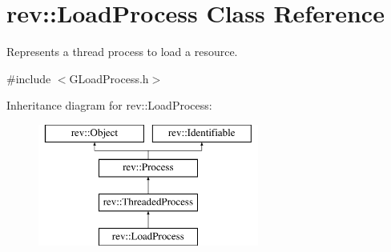 \hypertarget{classrev_1_1_load_process}{}\section{rev\+::Load\+Process Class Reference}
\label{classrev_1_1_load_process}


Represents a thread process to load a resource.  




{\ttfamily \#include $<$G\+Load\+Process.\+h$>$}

Inheritance diagram for rev\+::Load\+Process\+:\begin{figure}[H]
\begin{center}
\leavevmode
\includegraphics[height=4.000000cm]{classrev_1_1_load_process}
\end{center}
\end{figure}
